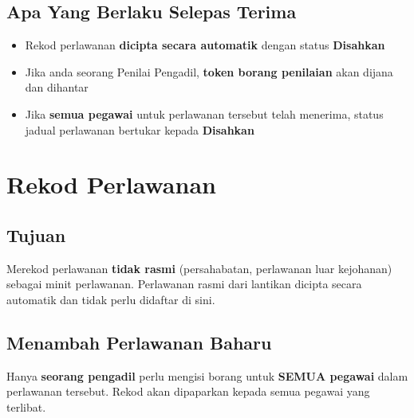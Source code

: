 \documentclass[12pt,a4paper]{report}
\newcommand{\status}[2]{\colorbox{#1!15}{\textcolor{#1}{\small\textbf{#2}}}}
\begin{document}
\subsection{Apa Yang Berlaku Selepas Terima}
\begin{itemize}[label=\textcolor{successgreen}{\faCheckCircle}]
  \item Rekod perlawanan \textbf{dicipta secara automatik} dengan status \status{successgreen}{Disahkan}
  \item Jika anda seorang Penilai Pengadil, \textbf{token borang penilaian} akan dijana dan dihantar
  \item Jika \textbf{semua pegawai} untuk perlawanan tersebut telah menerima, status jadual perlawanan bertukar kepada \status{successgreen}{Disahkan}
\end{itemize}

\section{Rekod Perlawanan}

\subsection{Tujuan}
Merekod perlawanan \textbf{tidak rasmi} (persahabatan, perlawanan luar kejohanan) sebagai minit perlawanan. Perlawanan rasmi dari lantikan dicipta secara automatik dan tidak perlu didaftar di sini.

\subsection{Menambah Perlawanan Baharu}

\begin{importantbox}
Hanya \textbf{seorang pengadil} perlu mengisi borang untuk \textbf{SEMUA pegawai} dalam perlawanan tersebut. Rekod akan dipaparkan kepada semua pegawai yang terlibat.
\end{importantbox}
\end{document}
